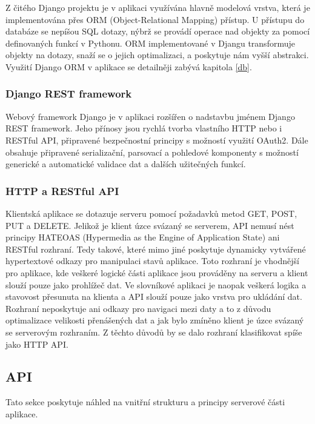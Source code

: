 \documentclass[a4paper,11pt,titlepage,fleqn]{article}
\begin{document}
            Z čitého Django projektu je v aplikaci využívána hlavně modelová vrstva, která je implementována přes ORM (Object-Relational Mapping) přístup. U přístupu do databáze se nepíšou SQL dotazy, nýbrž se provádí operace nad objekty za pomocí definovaných funkcí v Pythonu. ORM implementované v Djangu transformuje objekty na dotazy, snaží se o jejich optimalizaci, a poskytuje nám vyšší abstrakci\cite{bib:django}. Využití Django ORM v aplikace se detailněji zabývá kapitola \ref{db}. 

        \subsubsection{Django REST framework}
            Webový framework Django je v aplikaci rozšířen o nadstavbu jménem Django REST framework. Jeho přínosy jsou rychlá tvorba vlastního HTTP nebo i RESTful API, připravené bezpečnostní principy s možností využití OAuth2. Dále obsahuje připravené serializační, parsovací a pohledové komponenty s možností generické a automatické validace dat a dalších užitečných funkcí\cite{bib:django-rest}.

        \subsubsection{HTTP a RESTful API}
            Klientská aplikace se dotazuje serveru pomocí požadavků metod GET, POST, PUT a DELETE. Jelikož je klient úzce svázaný se serverem, API nemusí nést principy HATEOAS (Hypermedia as the Engine of Application State) ani RESTful rozhraní. Tedy takové, které mimo jiné poskytuje dynamicky vytvářené hypertextové odkazy pro manipulaci stavů aplikace. Toto rozhraní je vhodnější pro aplikace, kde veškeré logické části aplikace jsou prováděny na serveru a klient slouží pouze jako prohlížeč dat. Ve slovníkové aplikaci je naopak veškerá logika a stavovost přesunuta na klienta a API slouží pouze jako vrstva pro ukládání dat. Rozhraní neposkytuje ani odkazy pro navigaci mezi daty a to z důvodu optimalizace velikosti přenášených dat a jak bylo zmíněno klient je úzce svázaný se serverovým rozhraním. Z těchto důvodů by se dalo rozhraní klasifikovat spíše jako HTTP API.

    \subsection{API}
        Tato sekce poskytuje náhled na vnitřní strukturu a principy serverové části aplikace. 
\end{document}
